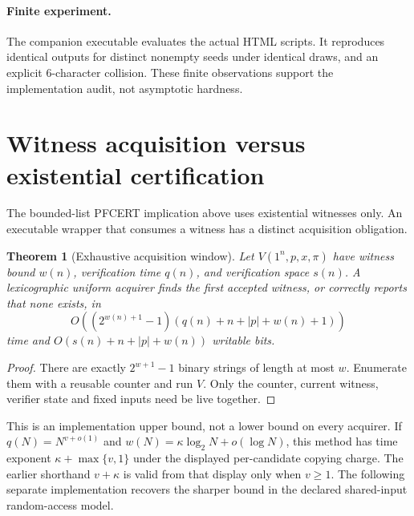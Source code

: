 \documentclass[11pt]{article}
\newtheorem{theorem}{Theorem}
\begin{document}
\paragraph{Finite experiment.} The companion executable evaluates the actual
HTML scripts. It reproduces identical outputs for distinct nonempty seeds
under identical draws, and an explicit 6-character collision. These finite
observations support the implementation audit, not asymptotic hardness.


\section{Witness acquisition versus existential certification}
The bounded-list PFCERT implication above uses existential witnesses only.
An executable wrapper that consumes a witness has a distinct acquisition
obligation.

\begin{theorem}[Exhaustive acquisition window]
Let \(V(1^n,p,x,\pi)\) have witness bound \(w(n)\), verification time
\(q(n)\), and verification space \(s(n)\). A lexicographic uniform acquirer
finds the first accepted witness, or correctly reports that none exists, in
\[
 O\!\left((2^{w(n)+1}-1)
 (q(n)+n+|p|+w(n)+1)\right)
\]
time and \(O(s(n)+n+|p|+w(n))\) writable bits.
\end{theorem}
\begin{proof}
There are exactly \(2^{w+1}-1\) binary strings of length at most \(w\).
Enumerate them with a reusable counter and run \(V\). Only the counter,
current witness, verifier state and fixed inputs need be live together.
\end{proof}
This is an implementation upper bound, not a lower bound on every acquirer.
If \(q(N)=N^{v+o(1)}\) and
\(w(N)=\kappa\log_2N+o(\log N)\), this method has time exponent
\(\kappa+\max\{v,1\}\) under the displayed per-candidate copying charge.
The earlier shorthand \(v+\kappa\) is valid from that display only when
\(v\ge1\).  The following separate implementation recovers the sharper
bound in the declared shared-input random-access model.
\end{document}
